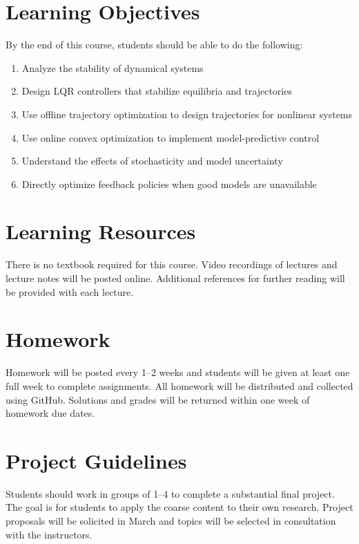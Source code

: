 \documentclass[11pt,letterpaper]{article}
\begin{document}
\section*{Learning Objectives}
By the end of this course, students should be able to do the following:
\begin{enumerate}
	\item Analyze the stability of dynamical systems
	\item Design LQR controllers that stabilize equilibria and trajectories
	\item Use offline trajectory optimization to design trajectories for nonlinear systems
	\item Use online convex optimization to implement model-predictive control
	\item Understand the effects of stochasticity and model uncertainty
	\item Directly optimize feedback policies when good models are unavailable
	
\end{enumerate}

\section*{Learning Resources}

There is no textbook required for this course. Video recordings of lectures and lecture notes will be posted online. Additional references for further reading will be provided with each lecture.

\section*{Homework}

Homework will be posted every 1--2 weeks and students will be given at least one full week to complete assignments. All homework will be distributed and collected using GitHub. Solutions and grades will be returned within one week of homework due dates.

\section*{Project Guidelines}

Students should work in groups of 1--4 to complete a substantial final project. The goal is for students to apply the coarse content to their own research. Project proposals will be solicited in March and topics will be selected in consultation with the instructors.
\end{document}

